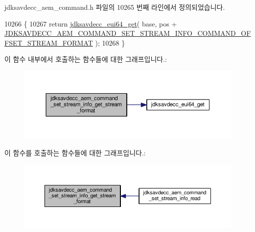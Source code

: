 jdksavdecc\+\_\+aem\+\_\+command.\+h 파일의 10265 번째 라인에서 정의되었습니다.


\begin{DoxyCode}
10266 \{
10267     \textcolor{keywordflow}{return} \hyperlink{group__eui64_ga2652311a25a6b91cddbed75c108c7031}{jdksavdecc\_eui64\_get}( base, pos + 
      \hyperlink{group__command__set__stream__info_gad1e39931a6700da6d1227bcfba9583b1}{JDKSAVDECC\_AEM\_COMMAND\_SET\_STREAM\_INFO\_COMMAND\_OFFSET\_STREAM\_FORMAT}
       );
10268 \}
\end{DoxyCode}


이 함수 내부에서 호출하는 함수들에 대한 그래프입니다.\+:
\nopagebreak
\begin{figure}[H]
\begin{center}
\leavevmode
\includegraphics[width=350pt]{group__command__set__stream__info_ga63a8f056b16ac001813c2d5092735558_cgraph}
\end{center}
\end{figure}




이 함수를 호출하는 함수들에 대한 그래프입니다.\+:
\nopagebreak
\begin{figure}[H]
\begin{center}
\leavevmode
\includegraphics[width=350pt]{group__command__set__stream__info_ga63a8f056b16ac001813c2d5092735558_icgraph}
\end{center}
\end{figure}


